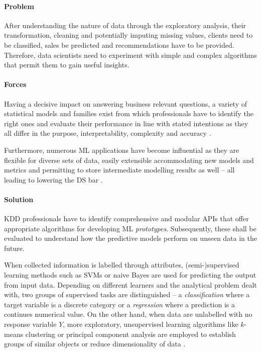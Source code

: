 \paragraph*{Problem}
After understanding the nature of data through the exploratory analysis, their transformation, cleaning and potentially imputing missing values, clients need to be classified, sales be predicted and recommendations have to be provided.
Therefore, data scientists need to experiment with simple and complex algorithms that permit them to gain useful insights.

\paragraph*{Forces}
\begin{compactitem}
  \item Having a decisive impact on answering business relevant questions, a variety of statistical models and families exist from which professionals have to identify the right ones and evaluate their performance in line with stated intentions as they all differ in the purpose, interpretability, complexity and accuracy \parencite{SAS2016}.
  \item Furthermore, numerous \ac{ML} applications have become influential as they are flexible for diverse sets of data, easily extensible accommodating new models and metrics and permitting to store intermediate modelling results as well -- all leading to lowering the \ac{DS} bar \parencites{GoebelMichGru1999}{ChenMinMao2014}{EslamiAli2012}.
\end{compactitem}

\paragraph*{Solution}
\ac{KDD} professionals have to identify comprehensive and modular \acp{API} that offer appropriate algorithms for developing \ac{ML} \emph{prototypes}. 
Subsequently, these shall be evaluated to understand how the predictive models perform on unseen data in the future.

When collected information is labelled through attributes, (semi-)supervised learning methods such as \acp{SVM} or naive Bayes are used for predicting the output from input data. 
Depending on different learners and the analytical problem dealt with, two groups of supervised tasks are distinguished -- a \emph{classification} where a target variable is a discrete category or a \emph{regression} where a prediction is a continues numerical value.
On the other hand, when data are unlabelled with no response variable $Y$, more exploratory, unsupervised learning algorithms like $k$-means clustering or principal component analysis are employed to establish groups of similar objects or reduce dimensionality of data \parencites{SAS2016}{NinaBookR2014}.

